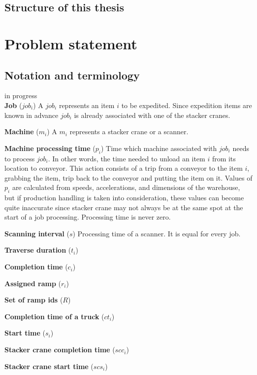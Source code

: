 \documentclass{ctuthesis}
\begin{document}
\section{Structure of this thesis}



\chapter{Problem statement}

\section{Notation and terminology}
in progress\\
\noindent \textbf{Job} ($job_i$) A $job_i$ represents an item $i$ to be expedited. Since expedition items are known in advance $job_i$ is already associated with one of the stacker cranes. 

\noindent \textbf{Machine} ($m_i$) A $m_i$ represents a stacker crane or a scanner. 

\noindent \textbf{Machine processing time} ($p_i$) Time which machine associated with $job_i$ needs to process $job_i$. In other words, the time needed to unload an item $i$ from its location to conveyor. This action consists of a trip from a conveyor to the item $i$, grabbing the item, trip back to the conveyor and putting the item on it. Values of $p_i$ are calculated from speeds, accelerations, and dimensions of the warehouse, but if production handling is taken into consideration, these values can become quite inaccurate since stacker crane may not always be at the same spot at the start of a job processing. Processing time is never zero.


\noindent \textbf{Scanning interval} ($s$) Processing time of a scanner. It is equal for every job.

\noindent \textbf{Traverse duration} ($t_i$)

\noindent \textbf{Completion time} ($c_i$)

\noindent \textbf{Assigned ramp} ($r_i$)

\noindent \textbf{Set of ramp ids} ($R$)

\noindent \textbf{Completion time of a truck} ($ct_i$)

\noindent \textbf{Start time} ($s_i$)

\noindent \textbf{Stacker crane completion time} ($scc_i$)

\noindent \textbf{Stacker crane start time} ($scs_i$)
\end{document}
